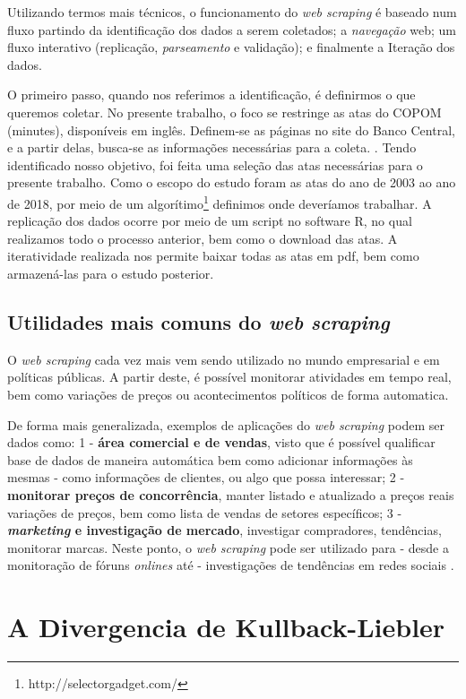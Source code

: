 Utilizando termos mais técnicos, o funcionamento do \textit{web scraping} é baseado num fluxo partindo da identificação dos dados a serem coletados; a \textit{navegação} web; um fluxo interativo (replicação, \textit{parseamento} e validação); e finalmente a Iteração dos dados.\cite{web2019}

O primeiro passo, quando nos referimos a identificação, é definirmos o que queremos coletar. No presente trabalho, o foco se restringe as atas do COPOM (minutes), disponíveis em inglês. Definem-se as páginas no site do Banco Central, e a partir delas, busca-se as informações necessárias para a coleta.  \cite{costa2016ensaios}. Tendo identificado nosso objetivo, foi feita uma seleção das atas necessárias para o presente trabalho. Como o escopo do estudo foram as atas do ano de 2003 ao ano de 2018, por meio de um algorítimo\footnote{http://selectorgadget.com/} definimos onde deveríamos trabalhar. A replicação dos dados ocorre por meio de um script no software R, no qual realizamos todo o processo anterior, bem como o download das atas. A iteratividade realizada nos permite baixar todas as atas em pdf, bem como armazená-las para o estudo posterior.


\subsection{Utilidades mais comuns do \textit{web scraping}}
O \textit{web scraping} cada vez mais vem sendo utilizado no mundo empresarial e em políticas públicas. A partir deste, é possível monitorar atividades em tempo real, bem como variações de preços ou acontecimentos políticos de forma automatica.

De forma mais generalizada, exemplos de aplicações do \textit{web scraping} podem ser dados como: 1 - \textbf{área comercial e de vendas}, visto que é possível qualificar base de dados de maneira automática bem como adicionar informações às mesmas - como informações de clientes, ou algo que possa interessar; 2 - \textbf{monitorar preços de concorrência}, manter listado e atualizado a preços reais variações de preços, bem como lista de vendas de setores específicos; 3 - \textbf{\textit{marketing} e investigação de mercado}, investigar compradores, tendências, monitorar marcas. Neste ponto, o \textit{web scraping} pode ser utilizado para - desde a monitoração de fóruns \textit{onlines} até - investigações de tendências em redes sociais \cite{web2019utilidade}.

\section{A Divergencia de Kullback-Liebler}

